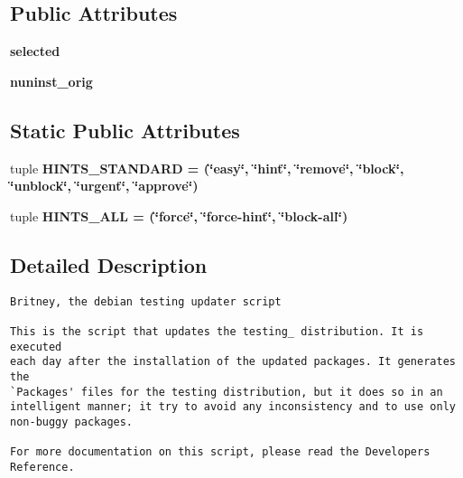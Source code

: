 \subsection*{Public Attributes}
\begin{CompactItemize}
\item 
\bf{selected}\label{classbritney_1_1Britney_07e771f94d4ce224d5677542db25034d}

\item 
\bf{nuninst\_\-orig}\label{classbritney_1_1Britney_d6169c55786a8ec7fb9773170b652da6}

\end{CompactItemize}
\subsection*{Static Public Attributes}
\begin{CompactItemize}
\item 
tuple \bf{HINTS\_\-STANDARD} = (\char`\"{}easy\char`\"{}, \char`\"{}hint\char`\"{}, \char`\"{}remove\char`\"{}, \char`\"{}block\char`\"{}, \char`\"{}unblock\char`\"{}, \char`\"{}urgent\char`\"{}, \char`\"{}approve\char`\"{})\label{classbritney_1_1Britney_ebbe3f40cca59e2de275b0558556ee63}

\item 
tuple \bf{HINTS\_\-ALL} = (\char`\"{}force\char`\"{}, \char`\"{}force-hint\char`\"{}, \char`\"{}block-all\char`\"{})\label{classbritney_1_1Britney_a088d6fd96963f87f88c9c40cda10bfa}

\end{CompactItemize}


\subsection{Detailed Description}


\footnotesize\begin{verbatim}Britney, the debian testing updater script

This is the script that updates the testing_ distribution. It is executed
each day after the installation of the updated packages. It generates the 
`Packages' files for the testing distribution, but it does so in an
intelligent manner; it try to avoid any inconsistency and to use only
non-buggy packages.

For more documentation on this script, please read the Developers Reference.
\end{verbatim}
\normalsize
 



